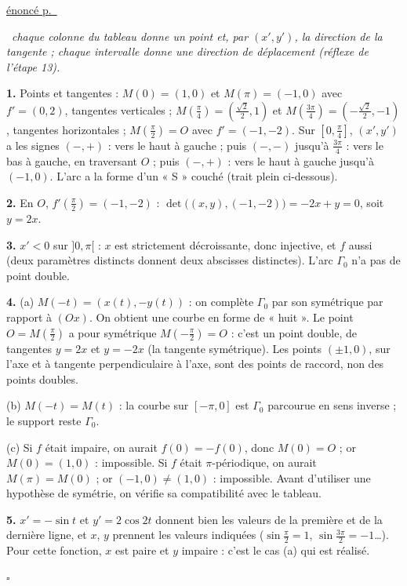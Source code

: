 \documentclass[a4paper,11pt]{article}
\numberwithin{equation}{section}
\numberwithin{figure}{section}
\numberwithin{table}{section}
\theoremstyle{enonce}
\theoremstyle{exemple}
\theoremstyle{remarque}
\newenvironment{corrige}[1]{%
  \par\needspace{6\baselineskip}\vspace{1em}\phantomsection\label{c:#1}%
  \noindent{\sffamily\bfseries\color{Bleu}Exercice~\ref{e:#1}}\quad
  {\scriptsize\sffamily\hyperref[e:#1]{\color{Gris}énoncé p.~\pageref{e:#1}}}\par\nobreak\vspace{0.2em}}%
  {\hfill\textcolor{BleuClair}{$\square$}\par}
\newcommand{\demarche}[1]{\noindent{\sffamily\bfseries\small\color{BleuMoyen}Démarche.}\ \textit{#1}\par\smallskip}
\begin{document}
\begin{corrige}{td-tab}
\demarche{chaque colonne du tableau donne un point et, par $(x',y')$, la direction de la tangente ; chaque intervalle donne une direction de déplacement (réflexe de l'étape 13).}
\textbf{1.} Points et tangentes : $M(0)=(1,0)$ et $M(\pi)=(-1,0)$ avec $f'=(0,2)$, tangentes verticales ;
$M\left(\frac\pi4\right)=\left(\frac{\sqrt2}2,1\right)$ et $M\left(\frac{3\pi}4\right)=\left(-\frac{\sqrt2}2,-1\right)$, tangentes horizontales ;
$M\left(\frac\pi2\right)=O$ avec $f'=(-1,-2)$. Sur $\left[0,\frac\pi4\right]$, $(x',y')$ a les signes $(-,+)$ : vers le haut
à gauche ; puis $(-,-)$ jusqu'à $\frac{3\pi}4$ : vers le bas à gauche, en traversant $O$ ; puis $(-,+)$ : vers le haut à
gauche jusqu'à $(-1,0)$. L'arc a la forme d'un « S » couché (trait plein ci-dessous).

\textbf{2.} En $O$, $f'\left(\frac\pi2\right)=(-1,-2)$ : $\det\big((x,y),(-1,-2)\big)=-2x+y=0$, soit $y=2x$.

\textbf{3.} $x'<0$ sur $]0,\pi[$ : $x$ est strictement décroissante, donc injective, et $f$ aussi (deux paramètres
distincts donnent deux abscisses distinctes). L'arc $\Gamma_0$ n'a pas de point double.

\textbf{4.} (a) $M(-t)=(x(t),-y(t))$ : on complète $\Gamma_0$ par son symétrique par rapport à $(Ox)$. On obtient une courbe en
forme de « huit ». Le point $O=M\left(\frac\pi2\right)$ a pour symétrique $M\left(-\frac\pi2\right)=O$ : c'est un point
double, de tangentes $y=2x$ et $y=-2x$ (la tangente symétrique). Les points $(\pm1,0)$, sur l'axe et à tangente
perpendiculaire à l'axe, sont des points de raccord, non des points doubles.

(b) $M(-t)=M(t)$ : la courbe sur $[-\pi,0]$ est $\Gamma_0$ parcourue en sens inverse ; le support reste $\Gamma_0$.

(c) Si $f$ était impaire, on aurait $f(0)=-f(0)$, donc $M(0)=O$ ; or $M(0)=(1,0)$ : impossible. Si $f$ était
$\pi$-périodique, on aurait $M(\pi)=M(0)$ ; or $(-1,0)\neq(1,0)$ : impossible. Avant d'utiliser une hypothèse de symétrie,
on vérifie sa compatibilité avec le tableau.

\textbf{5.} $x'=-\sin t$ et $y'=2\cos2t$ donnent bien les valeurs de la première et de la dernière ligne, et $x$, $y$
prennent les valeurs indiquées ($\sin\frac\pi2=1$, $\sin\frac{3\pi}2=-1$\dots). Pour cette fonction, $x$ est paire et $y$
impaire : c'est le cas (a) qui est réalisé.
\begin{center}
\end{center}
\end{corrige}
\end{document}
